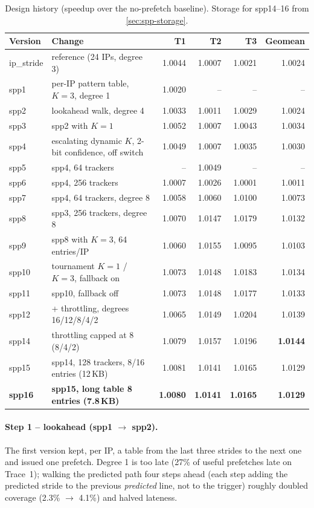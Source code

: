 \documentclass[12pt, a4paper]{article}
\newcommand{\tablesetup}{\small\renewcommand{\arraystretch}{1.15}\setlength{\tabcolsep}{4pt}}
\newcommand{\colhead}[1]{\textbf{#1}}
\begin{document}
\begin{table}[htbp]
\centering
\caption{Design history (speedup over the no-prefetch baseline). Storage for spp14--16 from \cref{sec:spp-storage}.}\label{tab:evolution}
\tablesetup
\footnotesize
\begin{tabularx}{\linewidth}{lLrrrr}
\toprule
{}\colhead{Version} & \colhead{Change} & \colhead{T1} & \colhead{T2} & \colhead{T3} & \colhead{Geomean} \\
\midrule
ip\_stride & reference (24 IPs, degree 3) & 1.0044 & 1.0007 & 1.0021 & 1.0024 \\
spp1  & per-IP pattern table, $K=3$, degree 1 & 1.0020 & -- & -- & -- \\
spp2  & lookahead walk, degree 4 & 1.0033 & 1.0011 & 1.0029 & 1.0024 \\
spp3  & spp2 with $K=1$ & 1.0052 & 1.0007 & 1.0043 & 1.0034 \\
spp4  & escalating dynamic $K$, 2-bit confidence, off switch & 1.0049 & 1.0007 & 1.0035 & 1.0030 \\
spp5  & spp4, 64 trackers & -- & 1.0049 & -- & -- \\
spp6  & spp4, 256 trackers & 1.0007 & 1.0026 & 1.0001 & 1.0011 \\
spp7  & spp4, 64 trackers, degree 8 & 1.0058 & 1.0060 & 1.0100 & 1.0073 \\
spp8  & spp3, 256 trackers, degree 8 & 1.0070 & 1.0147 & 1.0179 & 1.0132 \\
spp9  & spp8 with $K=3$, 64 entries/IP & 1.0060 & 1.0155 & 1.0095 & 1.0103 \\
spp10 & tournament $K=1$ / $K=3$, fallback on & 1.0073 & 1.0148 & 1.0183 & 1.0134 \\
spp11 & spp10, fallback off & 1.0073 & 1.0148 & 1.0177 & 1.0133 \\
spp12 & + throttling, degrees 16/12/8/4/2 & 1.0065 & 1.0149 & 1.0204 & 1.0139 \\
spp14 & throttling capped at 8 (8/4/2) & 1.0079 & 1.0157 & 1.0196 & \textbf{1.0144} \\
spp15 & spp14, 128 trackers, 8/16 entries (12\,KB) & 1.0081 & 1.0141 & 1.0165 & 1.0129 \\
\textbf{spp16} & \textbf{spp15, long table 8 entries (7.8\,KB)} & \textbf{1.0080} & \textbf{1.0141} & \textbf{1.0165} & \textbf{1.0129} \\
\bottomrule
\end{tabularx}
\end{table}

\paragraph{Step 1 -- lookahead (spp1 $\to$ spp2).} The first version kept, per
IP, a table from the last three strides to the next one and issued one
prefetch. Degree 1 is too late (27\% of useful prefetches late on Trace~1);
walking the predicted path four steps ahead (each step adding the predicted
stride to the previous \emph{predicted} line, not to the trigger) roughly
doubled coverage (2.3\% $\to$ 4.1\%) and halved lateness.
\end{document}
